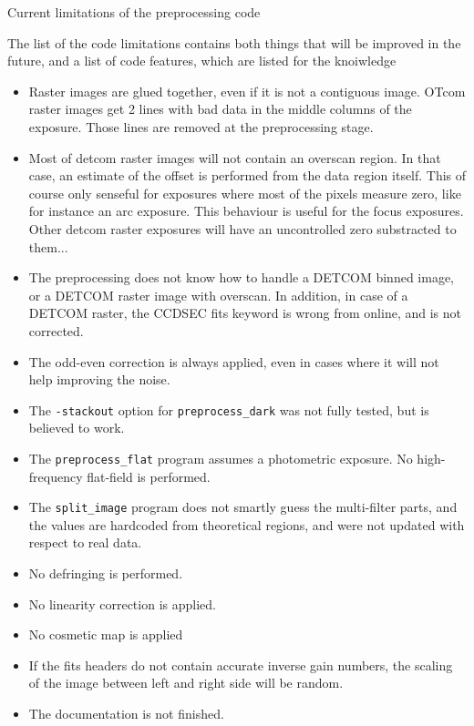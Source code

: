 \begin{subsection}{Current limitations of the preprocessing code}

The list of the code limitations contains both things that will be
improved in the future, and a list of code features, which are listed
for the knoiwledge

\begin{itemize}
\item Raster images are glued together, even if it is not a contiguous
image. 
OTcom raster images get 2 lines with bad data in the middle
columns of the exposure. Those lines are removed at the preprocessing
stage.
\item Most of detcom raster images will not contain an overscan
region. In that case, an estimate of the offset is performed from the
data region itself. This of course only senseful for exposures where
most of the pixels measure zero, like for instance an arc exposure.
This behaviour is useful for the focus exposures. Other detcom raster
exposures will have an uncontrolled zero substracted to them...
\item The preprocessing does not know how to handle a DETCOM binned image,
or a DETCOM raster image with overscan. In addition, in case of a DETCOM
raster, the CCDSEC fits keyword is wrong from online, and is not
corrected.
\item The odd-even correction is always applied, even in cases where
it will not help improving the noise.
\item The {\tt -stackout} option for {\tt preprocess\_dark} was not
fully tested, but is believed to work.
\item The {\tt preprocess\_flat} program assumes a photometric
exposure. No high-frequency flat-field is performed.
\item The {\tt split\_image} program does not smartly guess the
multi-filter parts, and the values are hardcoded from theoretical
regions, and were not updated with respect to real data.
\item No defringing is performed.
\item No linearity correction is applied.
\item No cosmetic map is applied
\item If the fits headers do not contain accurate inverse gain
numbers, the scaling of the image between left and right side will be
random.
\item The documentation is not finished.
\end{itemize}

\end{subsection}

